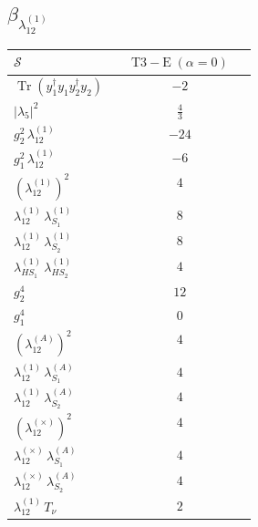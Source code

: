 \documentclass[9pt]{article}
\begin{document}
\subsection*{$ \beta_{\lambda_{12}^{(1)}} $}
\begin{longtable}{@{}p{0.31\linewidth}c@{}}
\toprule
$\mathcal{S}$ & $ \mathrm{T3-E}\;(\alpha=0) $ \\
\midrule
$ \operatorname{Tr}(y_1^\dagger y_1y_2^\dagger y_2) $ & $ -2 $ \\
$ |\lambda_5|^2 $ & $ \frac{4}{3} $ \\
$ g_2^2\,\lambda_{12}^{(1)} $ & $ -24 $ \\
$ g_1^2\,\lambda_{12}^{(1)} $ & $ -6 $ \\
$ \left(\lambda_{12}^{(1)}\right)^2 $ & $ 4 $ \\
$ \lambda_{12}^{(1)}\,\lambda_{S_1}^{(1)} $ & $ 8 $ \\
$ \lambda_{12}^{(1)}\,\lambda_{S_2}^{(1)} $ & $ 8 $ \\
$ \lambda_{HS_1}^{(1)}\,\lambda_{HS_2}^{(1)} $ & $ 4 $ \\
$ g_2^4 $ & $ 12 $ \\
$ g_1^4 $ & $ 0 $ \\
$ \left(\lambda_{12}^{(A)}\right)^2 $ & $ 4 $ \\
$ \lambda_{12}^{(1)}\,\lambda_{S_1}^{(A)} $ & $ 4 $ \\
$ \lambda_{12}^{(1)}\,\lambda_{S_2}^{(A)} $ & $ 4 $ \\
$ \left(\lambda_{12}^{(\times)}\right)^2 $ & $ 4 $ \\
$ \lambda_{12}^{(\times)}\,\lambda_{S_1}^{(A)} $ & $ 4 $ \\
$ \lambda_{12}^{(\times)}\,\lambda_{S_2}^{(A)} $ & $ 4 $ \\
$ \lambda_{12}^{(1)}\,T_\nu $ & $ 2 $ \\
\bottomrule
\end{longtable}
\end{document}
